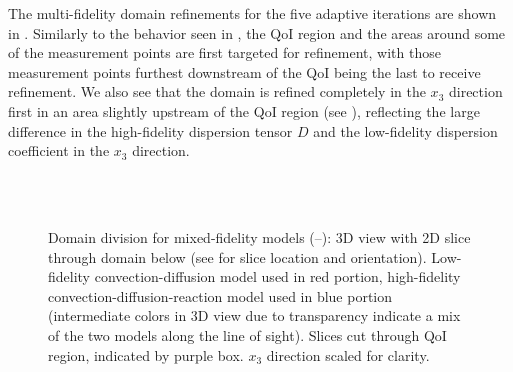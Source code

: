 The multi-fidelity domain refinements for the five adaptive iterations are shown in . Similarly to the behavior seen in , the QoI region and the areas around some of the measurement points are first targeted for refinement, with those measurement points furthest downstream of the QoI being the last to receive refinement. We also see that the domain is refined completely in the $x_3$ direction first in an area slightly upstream of the QoI region (see ), reflecting the large difference in the high-fidelity dispersion tensor $D$ and the low-fidelity dispersion coefficient in the $x_3$ direction.
%
\begin{figure}[htbp]
\centering
{}
\hfill
{}
\\
\hfill
{} \\
\hfill
{}

\caption{Domain division for mixed-fidelity models (\protect{}--\protect{}): 3D view with 2D slice through domain below (see \protect{} for slice location and orientation). Low-fidelity convection-diffusion model used in red portion, high-fidelity convection-diffusion-reaction model used in blue portion (intermediate colors in 3D view due to transparency indicate a mix of the two models along the line of sight). Slices cut through QoI region, indicated by purple box. $x_3$ direction scaled for clarity.}
\label{fig:divvy3D_diffmesh}
\end{figure}
%

